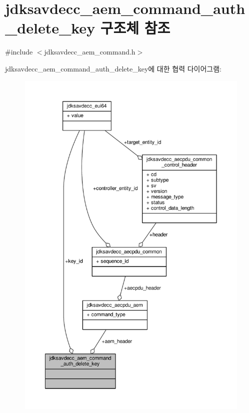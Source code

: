 \hypertarget{structjdksavdecc__aem__command__auth__delete__key}{}\section{jdksavdecc\+\_\+aem\+\_\+command\+\_\+auth\+\_\+delete\+\_\+key 구조체 참조}
\label{structjdksavdecc__aem__command__auth__delete__key}


{\ttfamily \#include $<$jdksavdecc\+\_\+aem\+\_\+command.\+h$>$}



jdksavdecc\+\_\+aem\+\_\+command\+\_\+auth\+\_\+delete\+\_\+key에 대한 협력 다이어그램\+:
\nopagebreak
\begin{figure}[H]
\begin{center}
\leavevmode
\includegraphics[width=350pt]{structjdksavdecc__aem__command__auth__delete__key__coll__graph}
\end{center}
\end{figure}
